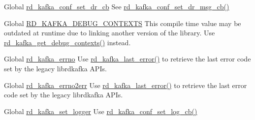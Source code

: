 \label{deprecated__deprecated000004}
\hypertarget{deprecated__deprecated000004}{}
 
\begin{DoxyDescription}
\item[Global \hyperlink{rdkafka_8h_a075b15c4141784fdc271de217005a41f}{rd\_\-kafka\_\-conf\_\-set\_\-dr\_\-cb} ]See \hyperlink{rdkafka_8h_ac1c9946aee26e10de2661fcf2242ea8a}{rd\_\-kafka\_\-conf\_\-set\_\-dr\_\-msg\_\-cb()} 
\end{DoxyDescription}

\label{deprecated__deprecated000001}
\hypertarget{deprecated__deprecated000001}{}
 
\begin{DoxyDescription}
\item[Global \hyperlink{rdkafka_8h_aed25dba90c47adc8ae51d098dca2aed9}{RD\_\-KAFKA\_\-DEBUG\_\-CONTEXTS} ]This compile time value may be outdated at runtime due to linking another version of the library. Use \hyperlink{rdkafka_8h_adece97d3cbdd6ca936df5b0663118c45}{rd\_\-kafka\_\-get\_\-debug\_\-contexts()} instead. 
\end{DoxyDescription}

\label{deprecated__deprecated000003}
\hypertarget{deprecated__deprecated000003}{}
 
\begin{DoxyDescription}
\item[Global \hyperlink{rdkafka_8h_a8aa1b1a41d2fc0c487f519663609df4f}{rd\_\-kafka\_\-errno} ]Use \hyperlink{rdkafka_8h_ae7b90c323d460e0276d79f6ab69e93b7}{rd\_\-kafka\_\-last\_\-error()} to retrieve the last error code set by the legacy librdkafka APIs. 
\end{DoxyDescription}

\label{deprecated__deprecated000002}
\hypertarget{deprecated__deprecated000002}{}
 
\begin{DoxyDescription}
\item[Global \hyperlink{rdkafka_8h_abeabf8589c657d7a3ec5a1411a7de91d}{rd\_\-kafka\_\-errno2err} ]Use \hyperlink{rdkafka_8h_ae7b90c323d460e0276d79f6ab69e93b7}{rd\_\-kafka\_\-last\_\-error()} to retrieve the last error code set by the legacy librdkafka APIs.


\end{DoxyDescription}

\label{deprecated__deprecated000005}
\hypertarget{deprecated__deprecated000005}{}
 
\begin{DoxyDescription}
\item[Global \hyperlink{rdkafka_8h_a9e4af9adee414af74c7817403f7c4a53}{rd\_\-kafka\_\-set\_\-logger} ]Use \hyperlink{rdkafka_8h_a06ade2ca41f32eb82c6f7e3d4acbe19f}{rd\_\-kafka\_\-conf\_\-set\_\-log\_\-cb()}


\end{DoxyDescription}